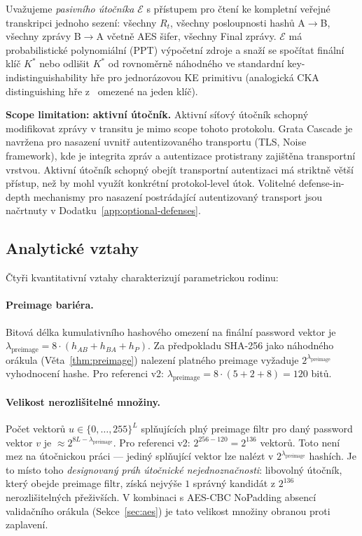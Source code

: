 \documentclass[11pt,a4paper]{article}
\begin{document}
Uvažujeme \emph{pasivního útočníka} $\mathcal{E}$ s přístupem pro čtení ke kompletní veřejné transkripci jednoho sezení: všechny $R_t$, všechny posloupnosti hashů A$\to$B, všechny zprávy B$\to$A včetně AES šifer, všechny Final zprávy. $\mathcal{E}$ má probabilistické polynomiální (PPT) výpočetní zdroje a snaží se spočítat finální klíč $K^*$ nebo odlišit $K^*$ od rovnoměrně náhodného ve standardní key-indistinguishability hře pro jednorázovou KE primitivu (analogická CKA distinguishing hře z~\cite{ACD19} omezené na jeden klíč).

\textbf{Scope limitation: aktivní útočník.} Aktivní síťový útočník schopný modifikovat zprávy v transitu je mimo scope tohoto protokolu. Grata Cascade je navržena pro nasazení uvnitř autentizovaného transportu (TLS, Noise framework), kde je integrita zpráv a autentizace protistrany zajištěna transportní vrstvou. Aktivní útočník schopný obejít transportní autentizaci má striktně větší přístup, než by mohl využít konkrétní protokol-level útok. Volitelné defense-in-depth mechanismy pro nasazení postrádající autentizovaný transport jsou načrtnuty v Dodatku~\ref{app:optional-defenses}.

\subsection{Analytické vztahy}

Čtyři kvantitativní vztahy charakterizují parametrickou rodinu:

\paragraph{Preimage bariéra.} Bitová délka kumulativního hashového omezení na finální password vektor je $\lambda_\text{preimage} = 8 \cdot (h_{AB} + h_{BA} + h_P)$. Za předpokladu SHA-256 jako náhodného orákula (Věta~\ref{thm:preimage}) nalezení platného preimage vyžaduje $2^{\lambda_\text{preimage}}$ vyhodnocení hashe. Pro referenci v2: $\lambda_\text{preimage} = 8 \cdot (5 + 2 + 8) = 120$ bitů.

\paragraph{Velikost nerozlišitelné množiny.} Počet vektorů $u \in \{0,\ldots,255\}^L$ splňujících plný preimage filtr pro daný password vektor $v$ je $\approx 2^{8L - \lambda_\text{preimage}}$. Pro referenci v2: $2^{256 - 120} = 2^{136}$ vektorů. Toto není mez na útočnickou práci --- jediný splňující vektor lze nalézt v $2^{\lambda_\text{preimage}}$ hashích. Je to místo toho \emph{designovaný práh útočnické nejednoznačnosti}: libovolný útočník, který obejde preimage filtr, získá nejvýše $1$ správný kandidát z $2^{136}$ nerozlišitelných přeživších. V kombinaci s AES-CBC NoPadding absencí validačního orákula (Sekce~\ref{sec:aes}) je tato velikost množiny obranou proti zaplavení.
\end{document}
